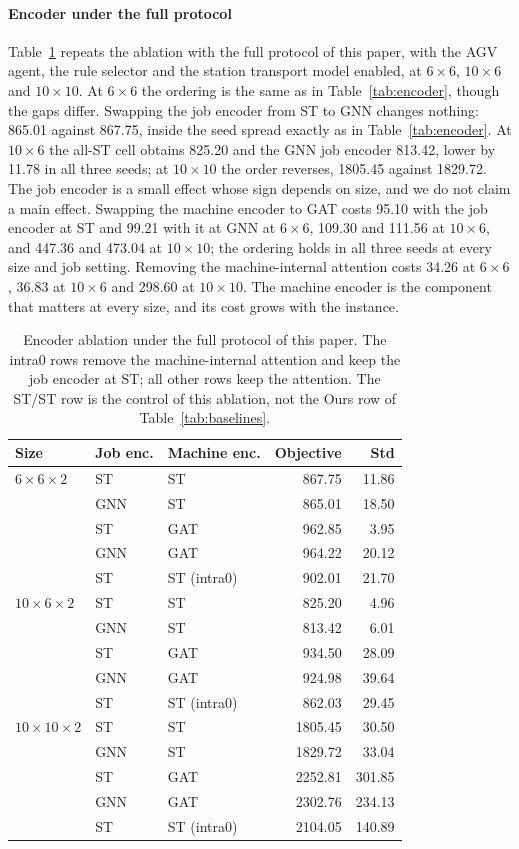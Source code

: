 \paragraph{Encoder under the full protocol} Table~\ref{tab:encoderfull}
repeats the ablation with the full protocol of this paper, with the AGV agent,
the rule selector and the station transport model enabled, at $6\times6$,
$10\times6$ and $10\times10$. At $6\times6$ the ordering is the same as in
Table~\ref{tab:encoder}, though the gaps differ. Swapping the job encoder from
ST to GNN changes nothing: 865.01 against 867.75, inside the seed spread exactly
as in Table~\ref{tab:encoder}. At $10\times6$ the all-ST cell obtains 825.20 and
the GNN job encoder 813.42, lower by 11.78 in all three seeds; at $10\times10$
the order reverses, 1805.45 against 1829.72. The job encoder
is a small effect whose sign depends on size, and we do not claim a main effect.
Swapping the machine encoder to GAT costs 95.10 with the job encoder at ST and
99.21 with it at GNN at $6\times6$, 109.30 and 111.56 at $10\times6$, and
447.36 and 473.04 at $10\times10$; the ordering holds in all three seeds at
every size and job setting. Removing the machine-internal attention costs 34.26
at $6\times6$, 36.83 at $10\times6$ and 298.60 at $10\times10$. The machine
encoder is the component that matters at every size, and its cost grows with the
instance.

\begin{table}[t]
\centering
\caption{Encoder ablation under the full protocol of this paper. The intra0 rows
remove the machine-internal attention and keep the job encoder at ST; all other
rows keep the attention. The ST/ST row is the control of this ablation, not the
Ours row of Table~\ref{tab:baselines}.}
\label{tab:encoderfull}
\small
\setlength{\tabcolsep}{2.5pt}
\begin{tabular}{lllrr}
\toprule
Size & Job enc. & Machine enc. & Objective & Std \\
\midrule
$6\times6\times2$ & ST & ST & 867.75 & 11.86 \\
 & GNN & ST & 865.01 & 18.50 \\
 & ST & GAT & 962.85 & 3.95 \\
 & GNN & GAT & 964.22 & 20.12 \\
 & ST & ST (intra0) & 902.01 & 21.70 \\
\midrule
$10\times6\times2$ & ST & ST & 825.20 & 4.96 \\
 & GNN & ST & 813.42 & 6.01 \\
 & ST & GAT & 934.50 & 28.09 \\
 & GNN & GAT & 924.98 & 39.64 \\
 & ST & ST (intra0) & 862.03 & 29.45 \\
\midrule
$10\times10\times2$ & ST & ST & 1805.45 & 30.50 \\
 & GNN & ST & 1829.72 & 33.04 \\
 & ST & GAT & 2252.81 & 301.85 \\
 & GNN & GAT & 2302.76 & 234.13 \\
 & ST & ST (intra0) & 2104.05 & 140.89 \\
\bottomrule
\end{tabular}
\end{table}


